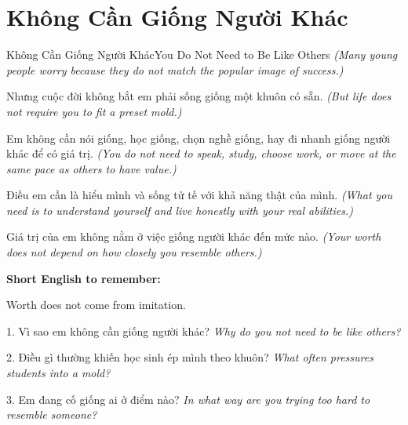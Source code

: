 \section{Không Cần Giống Người Khác}
\begin{truyen}{Không Cần Giống Người Khác}{You Do Not Need to Be Like Others}
\textit{(Many young people worry because they do not match the popular image of success.)}

Nhưng cuộc đời không bắt em phải sống giống một khuôn có sẵn.
\textit{(But life does not require you to fit a preset mold.)}

Em không cần nói giống, học giống, chọn nghề giống, hay đi nhanh giống người khác để có giá trị.
\textit{(You do not need to speak, study, choose work, or move at the same pace as others to have value.)}

Điều em cần là hiểu mình và sống tử tế với khả năng thật của mình.
\textit{(What you need is to understand yourself and live honestly with your real abilities.)}
\end{truyen}

\begin{baihoc}
Giá trị của em không nằm ở việc giống người khác đến mức nào.
\textit{(Your worth does not depend on how closely you resemble others.)}
\end{baihoc}

\begin{ghinhoanh}
\textbf{Short English to remember:}

Worth does not come from imitation.

\end{ghinhoanh}

\begin{tuhocnhanh}
1. Vì sao em không cần giống người khác? \textit{Why do you not need to be like others?}

2. Điều gì thường khiến học sinh ép mình theo khuôn? \textit{What often pressures students into a mold?}

3. Em đang cố giống ai ở điểm nào? \textit{In what way are you trying too hard to resemble someone?}
\end{tuhocnhanh}
\ngancach

